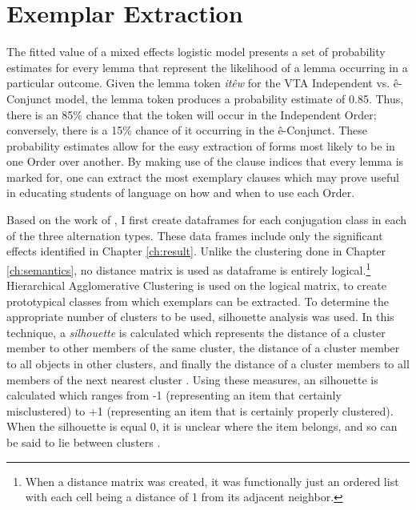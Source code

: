 \section{Exemplar Extraction}
The fitted value of a mixed effects logistic model presents a set of probability estimates for every lemma that represent the likelihood of a lemma occurring in a particular outcome. Given the lemma token \textit{itêw} for the VTA Independent vs. ê-Conjunct model, the lemma token produces a probability estimate of 0.85. Thus, there is an 85\% chance that the token will occur in the Independent Order; conversely, there is a 15\% chance of it occurring in the ê-Conjunct. These probability estimates allow for the easy extraction of forms most likely to be in one Order over another. By making use of the clause indices that every lemma is marked for, one can extract the most exemplary clauses which may prove useful in educating students of language on how and when to use each Order. 

Based on the work of \citet{arppe2008univariate}, I first create dataframes for each conjugation class in each of the three alternation types. These data frames include only the significant effects identified in Chapter \ref{ch:result}. Unlike the clustering done in Chapter \ref{ch:semantics}, no distance matrix is used as dataframe is entirely logical.\footnote{When a distance matrix was created, it was functionally just an ordered list with each cell being a distance of 1 from its adjacent neighbor.} Hierarchical Agglomerative Clustering is used on the logical matrix, to create prototypical classes from which exemplars can be extracted. To determine the appropriate number of clusters to be used, silhouette analysis \citep{rousseeuw1987silhouettes} was used. In this technique, a \textit{silhouette} is calculated which represents the distance of a cluster member to other members of the same cluster, the distance of a cluster member to all objects in other clusters, and finally the distance of a cluster members to all members of the next nearest cluster \citep{rousseeuw1987silhouettes}. Using these measures, an silhouette is calculated which ranges from -1 (representing an item that certainly misclustered) to +1 (representing an item that is certainly properly clustered). When the silhouette is equal 0, it is unclear where the item belongs, and so can be said to lie between clusters \citep{rousseeuw1987silhouettes}. 

